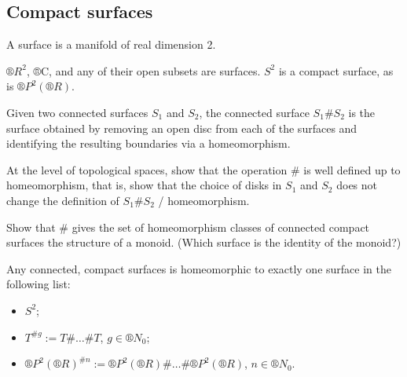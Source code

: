 \documentclass[12pt]{article}					%
\begin{document}
\subsection{Compact surfaces}
\begin{definice}[Surface]
	A surface is a manifold of real dimension 2.
\end{definice}

\begin{priklady}
	$®R^2$, ®C, and any of their open subsets are surfaces. $S^2$ is a compact surface, as is $®P^2(®R)$.
\end{priklady}

\begin{definice}
	Given two connected surfaces $S_1$ and $S_2$, the connected surface $S_1 \# S_2$ is the surface obtained by removing an open disc from each of the surfaces and identifying the resulting boundaries via a homeomorphism.
\end{definice}

\begin{priklad}
	At the level of topological spaces, show that the operation $\#$ is well defined up to homeomorphism, that is, show that the choice of disks in $S_1$ and $S_2$ does not change the definition of $S_1 \# S_2$ / homeomorphism.
\end{priklad}

\begin{priklad}
	Show that $\#$ gives the set of homeomorphism classes of connected compact surfaces the structure of a monoid. (Which surface is the identity of the monoid?)
\end{priklad}

\begin{veta}
	Any connected, compact surfaces is homeomorphic to exactly one surface in the following list:
	\begin{itemize}
		\item $S^2$;
		\item $T^{\# g} := T \# … \# T$, $g \in ®N_0$;
		\item $®P^2(®R)^{\#n} := ®P^2(®R) \# … \# ®P^2(®R)$, $n \in ®N_0$.
	\end{itemize}
\end{veta}
\end{document}
